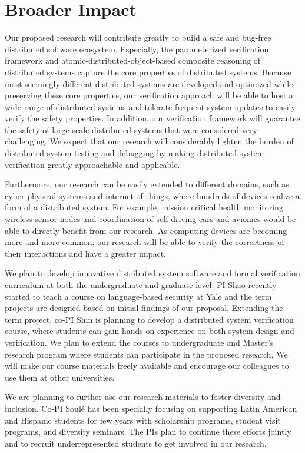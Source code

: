 

\section{Broader Impact}

Our proposed research will contribute greatly to build a safe and
bug-free distributed software ecosystem. Especially, the parameterized
verification framework and atomic-distributed-object-based composite
reasoning of distributed systems capture the core properties of
distributed systems. Because most seemingly different distributed
systems are developed and optimized while preserving these core
properties, our verification approach will be able to host a wide
range of distributed systems and tolerate frequent system updates to
easily verify the safety properties. In addition, our verification
framework will guarantee the safety of large-scale distributed systems
that were considered very challenging. We expect that our research
will considerably lighten the burden of distributed system testing and
debugging by making distributed system verification greatly
approachable and applicable.

Furthermore, our research can be easily extended to different domains,
such as cyber physical systems and internet of things, where hundreds
of devices realize a form of a distributed system. For example,
mission critical health monitoring wireless sensor nodes and
coordination of self-driving cars and avionics would be able to
directly benefit from our research. As computing devices are becoming
more and more common, our research will be able to verify the
correctness of their interactions and have a greater impact.

We plan to develop innovative distributed system software and formal
verification curriculum at both the undergraduate and graduate
level. PI Shao recently started to teach a course on language-based
security at Yale and the term projects are designed based on initial
findings of our proposal.  Extending the term project, co-PI Shin is
planning to develop a distributed system verification course, where
students can gain hands-on experience on both system design and
verification. We plan to extend the courses to undergraduate and
Master's research program where students can participate in the
proposed research. We will make our course materials freely available
and encourage our colleagues to use them at other universities.

We are planning to further use our research materials to foster
diversity and inclusion. Co-PI Soul\'e has been specially focusing
on supporting Latin American and Hispanic students for few years with
scholarship programs, student visit programs, and diversity seminars. 
The PIs plan to continue these efforts jointly and to recruit 
underrepresented students to get involved in our research.

